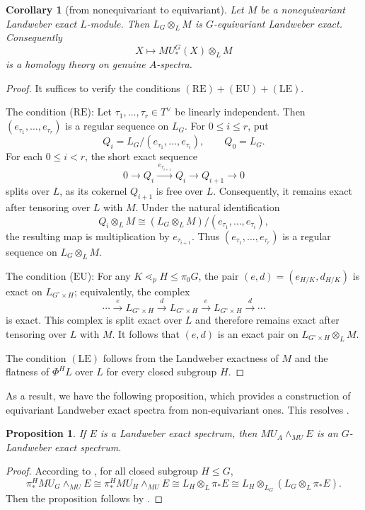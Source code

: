 \documentclass[11pt,reqno]{amsart}
\newtheorem{proposition}[proposition]{Proposition}
\newtheorem{corollary}[corollary]{Corollary}
\newcommand{\tensor}{\otimes}
\newcommand{\lessdotp}{\mathrel{\lessdot_p}}
\begin{document}
\begin{corollary}[from nonequivariant to equivariant]\label{cor:ordinary-implies-equivariant}
  Let $M$ be a nonequivariant Landweber exact $L$-module. Then $L_G\otimes_L M$ is $G$-equivariant Landweber exact. Consequently
  \[
  X\longmapsto MU_*^G(X)\tensor_LM
  \]
  is a homology theory on genuine $A$-spectra.
\end{corollary}
\begin{proof}
  It suffices to verify the conditions $(\mathrm{RE})+(\mathrm{EU})+ (\mathrm{LE})$.

  The condition ($\mathrm{RE}$): Let $\tau_1,\dots,\tau_r\in T^\vee$ be linearly independent. Then $(e_{\tau_1},\dots,e_{\tau_r})$ is a regular sequence on $L_G$. For $0\leq i\leq r$, put
  \[
  Q_i=L_G/(e_{\tau_1},\dots,e_{\tau_i}), \qquad Q_0=L_G.
  \]
  For each $0\leq i<r$, the short exact sequence
  \[
  0\longrightarrow Q_i \xrightarrow{\,e_{\tau_{i+1}}\,} Q_i \longrightarrow Q_{i+1}\longrightarrow 0
  \]
  splits over $L$, as its cokernel $Q_{i+1}$ is free over $L$. Consequently, it remains exact after tensoring over $L$ with $M$. Under the natural identification
  \[
  Q_i\otimes_L M \cong (L_G\otimes_L M)/(e_{\tau_1},\dots,e_{\tau_i}),
  \]
  the resulting map is multiplication by $e_{\tau_{i+1}}$. Thus $(e_{\tau_1},\dots,e_{\tau_r})$ is a regular sequence on $L_G\otimes_L M$.

  The condition ($\mathrm{EU}$): For any $K\lessdotp H\leq\pi_0G$, the pair $(e,d)=(e_{H/K},d_{H/K})$ is exact on $L_{G^\circ\times H}$; equivalently, the complex
  \[
  \cdots \xrightarrow{\,e\,} L_{G^\circ\times H} \xrightarrow{\,d\,} L_{G^\circ\times H} \xrightarrow{\,e\,} L_{G^\circ\times H} \xrightarrow{\,d\,} \cdots
  \]
  is exact. This complex is split exact over $L$ and therefore remains exact after tensoring over $L$ with $M$. It follows that $(e,d)$ is an exact pair on $L_{G^\circ\times H}\otimes_L M$.

  The condition $(\mathrm{LE})$ follows from the Landweber exactness of $M$ and the flatness of $\Phi^H L$ over $L$ for every closed subgroup $H$.
\end{proof}

As a result, we have the following proposition, which provides a construction of equivariant Landweber exact spectra from non-equivariant ones. This resolves \cite[Conjecture 2.18]{wisdom2024properties}.
\begin{proposition}\label{prop:conjecture-in-Wisdom}
  If $E$ is a Landweber exact spectrum, then $MU_A \wedge_{MU} E$ is an $G$-Landweber exact spectrum.
\end{proposition}
\begin{proof}
  According to \cite[Theorem 1.1]{may1998equivariant}, for all closed subgroup $H\leq G$, 
  $$\pi_*^H MU_G\wedge_{MU} E \cong \pi_*^H MU_H\wedge_{MU} E \cong L_H\otimes_L \pi_*E \cong L_H\otimes_{L_G} (L_G\otimes_L \pi_*E).$$
  Then the proposition follows by .
\end{proof}







\end{document}
